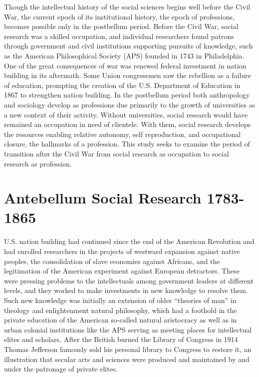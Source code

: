 \documentclass[]{book}
\begin{document}
Though the intellectual history of the social sciences begins well
before the Civil War, the current epoch of its institutional history,
the epoch of professions, becomes possible only in the postbellum
period. Before the Civil War, social research was a skilled occupation,
and individual researchers found patrons through government and civil
institutions supporting pursuits of knowledge, such as the American
Philosophical Society (APS) founded in 1743 in Philadelphia. One of the
great consequences of war was renewed federal investment in nation
building in its aftermath. Some Union congressmen saw the rebellion as a
failure of education, prompting the creation of the U.S. Department of
Education in 1867 to strengthen nation building. In the postbellum
period both anthropology and sociology develop as professions due
primarily to the growth of universities as a new context of their
activity. Without universities, social research would have remained an
occupation in need of clientele. With them, social research develops the
resources enabling relative autonomy, self reproduction, and
occupational closure, the hallmarks of a profession. This study seeks to
examine the period of transition after the Civil War from social
research as occupation to social research as profession.

\section{Antebellum Social Research
1783-1865}\label{antebellum-social-research-1783-1865}

U.S. nation building had continued since the end of the American
Revolution and had enrolled researchers in the projects of westward
expansion against native peoples, the consolidation of slave economies
against Africans, and the legitimation of the American experiment
against European detractors. These were pressing problems to the
intellectuals among government leaders at different levels, and they
worked to make investments in new knowledge to resolve them. Such new
knowledge was initially an extension of older ``theories of man'' in
theology and enlightenment natural philosophy, which had a foothold in
the private education of the American so-called natural aristocracy as
well as in urban colonial institutions like the APS serving as meeting
places for intellectual elites and scholars. After the British burned
the Library of Congress in 1914 Thomas Jefferson famously sold his
personal library to Congress to restore it, an illustration that secular
arts and sciences were produced and maintained by and under the
patronage of private elites.
\end{document}
